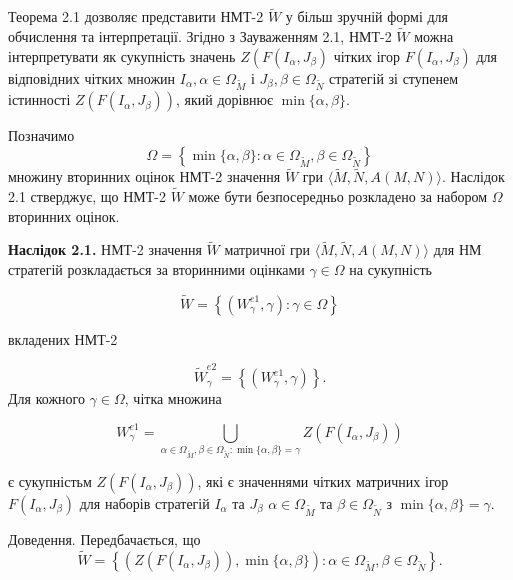 \documentclass[14pt, a4paper, oneside]{extarticle}
\numberwithin{equation}{section}
\begin{document}
Теорема 2.1 дозволяє представити НМТ-2 $\tilde{W}$ у більш зручній формі для обчислення та інтерпретації. Згідно з Зауваженням 2.1, НМТ-2 $\tilde{W}$ можна інтерпретувати як сукупність значень $Z\left(F\left(I_{\alpha}, J_{\beta}\right)\right.$ чітких ігор $F\left(I_{\alpha}, J_{\beta}\right)$ для відповідних чітких множин $I_{\alpha}, \alpha \in \Omega_{\tilde{M}}$ і $J_{\beta}, \beta \in \Omega_{\tilde{N}}$ стратегій зі ступенем істинності $Z\left(F\left(I_{\alpha}, J_{\beta}\right)\right)$, який дорівнює $\min \{\alpha, \beta\}$.

Позначимо
\begin{equation*}
\Omega=\left\{\min \{\alpha, \beta\}: \alpha \in \Omega_{\tilde{M}}, \beta \in \Omega_{\tilde{N}}\right\}
\end{equation*}
\noindent множину вторинних оцінок НМТ-2 значення $\tilde{W}$ гри $\langle\tilde{M}, \tilde{N}, A(M, N)\rangle$. Наслідок 2.1 стверджує, що НМТ-2 $\tilde{W}$ може бути безпосередньо розкладено за набором $\Omega$ вторинних оцінок.

\noindent \textbf{Наслідок 2.1.} НМТ-2 значення $\tilde{W}$ матричної гри $\langle\tilde{M}, \tilde{N}, A(M, N)\rangle$ для НМ стратегій розкладається за вторинними оцінками $\gamma \in \Omega$ на сукупність

\begin{equation*}
\tilde{W}=\left\{\left(W_{\gamma}^{e 1}, \gamma\right): \gamma \in \Omega\right\}
\end{equation*}

\noindent вкладених НМТ-2

\begin{equation*}
\tilde{W}_{\gamma}^{e 2}=\left\{\left(W_{\gamma}^{e 1}, \gamma\right)\right\}.
\end{equation*}
Для кожного $\gamma \in \Omega$, чітка множина

\begin{equation*}
W_{\gamma}^{e 1}=\bigcup_{\alpha \in \Omega_{\tilde{M}}, \beta \in \Omega_{\tilde{N}}: \min \{\alpha, \beta\}=\gamma} Z\left(F\left(I_{\alpha}, J_{\beta}\right)\right)
\end{equation*}

\noindent є сукупністьм $Z\left(F\left(I_{\alpha}, J_{\beta}\right)\right)$, які є значеннями чітких матричних ігор $F\left(I_{\alpha}, J_{\beta}\right)$ для наборів стратегій $I_{\alpha}$ та $J_{\beta}$ $\alpha \in \Omega_{\tilde{M}}$ та $\beta \in \Omega_{\tilde{N}}$ з $\min \{\alpha, \beta\}=\gamma$.

\noindent Доведення. Передбачається, що
\begin{equation*}
\tilde{W}=\left\{\left(Z\left(F\left(I_{\alpha}, J_{\beta}\right)\right), \min \{\alpha, \beta\}\right): \alpha \in \Omega_{\tilde{M}}, \beta \in \Omega_{\tilde{N}}\right\}.
\end{equation*}
\end{document}
